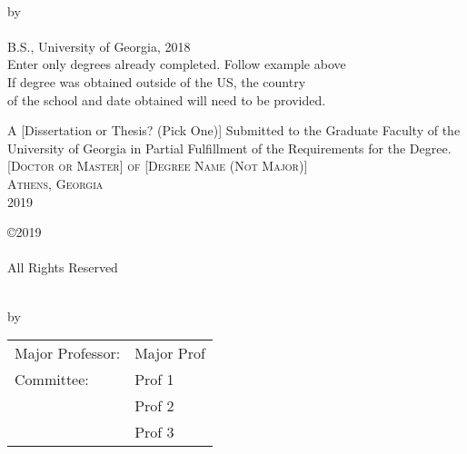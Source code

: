 \documentclass[12pt, notitlepage]{report} %
\begin{document}
\newpage
{}
\thispagestyle{empty}
\vspace*{18pt}
\begin{center}
  \textsc{\doctitle}\\[18pt]
  by\\[12pt]
  \textsc{\docauthor}\\[8pt]
  B.S., University of Georgia, 2018\\
  Enter only degrees already completed. Follow example above\\
  If degree was obtained outside of the US, the country \\
  of the school and date obtained will need to be provided.

  \vfill
  A [Dissertation or Thesis? (Pick One)] Submitted to the Graduate Faculty of the\\ University of Georgia in Partial Fulfillment of the Requirements for the Degree.\\ [18pt]

  \textsc{[Doctor or Master] of [Degree Name (Not Major)]}\\[24pt]
  \textsc{Athens, Georgia}\\[18pt]
  2019
\end{center}



\newpage
\thispagestyle{empty}
\vspace*{6.6in}
\begin{center}
  \copyright 2019\\
  \docauthor\\
  All Rights Reserved
\end{center}

\newpage
\thispagestyle{empty}
\vspace*{18pt}
\begin{center}
  \textsc{\doctitle}\\[18pt]
  by\\[18pt]
  \textsc{\docauthor}
\end{center}
\vfill

\begin{flushright}
  \begin{tabular}{ll}
    Major Professor: & Major Prof \\ [8pt]
    Committee: & Prof 1 \\
    & Prof 2 \\
    & Prof 3 \\
  \end{tabular}
\end{flushright}
\end{document}
